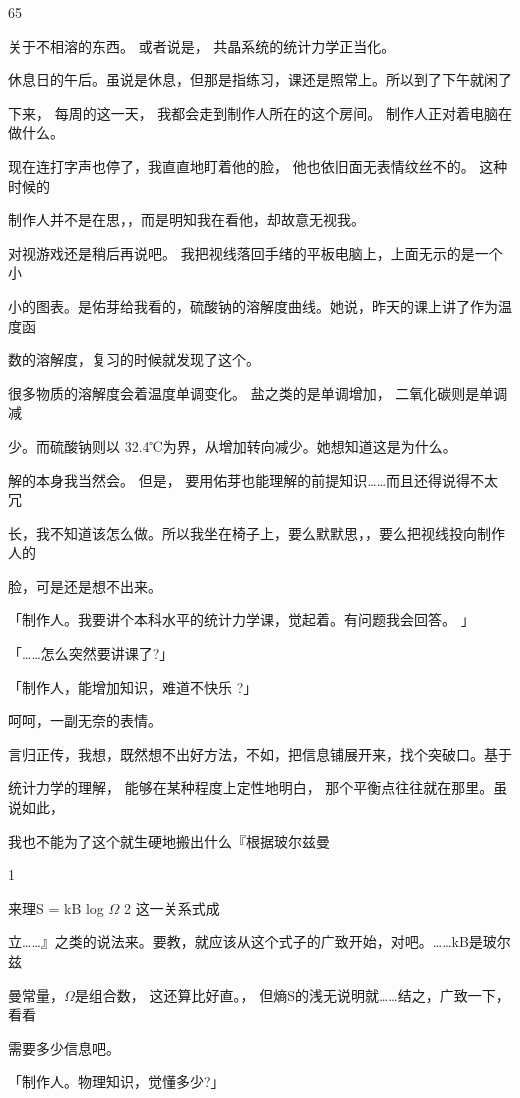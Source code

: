 65\par
关于不相溶的东西。 或者说是， 共晶系统的统计力学正当化。\par
休息日的午后。虽说是休息，但那是指练习，课还是照常上。所以到了下午就闲了\par
下来， 每周的这一天， 我都会走到制作人所在的这个房间。 制作人正对着电脑在做什么。\par
现在连打字声也停了，我直直地盯着他的脸， 他也依旧面无表情纹丝不的。 这种时候的\par
制作人并不是在思，，而是明知我在看他，却故意无视我。\par
对视游戏还是稍后再说吧。 我把视线落回手绪的平板电脑上，上面无示的是一个小\par
小的图表。是佑芽给我看的，硫酸钠的溶解度曲线。她说，昨天的课上讲了作为温度函\par
数的溶解度，复习的时候就发现了这个。\par
很多物质的溶解度会着温度单调变化。 盐之类的是单调增加， 二氧化碳则是单调减\par
少。而硫酸钠则以 32.4℃为界，从增加转向减少。她想知道这是为什么。\par
解的本身我当然会。 但是， 要用佑芽也能理解的前提知识……而且还得说得不太冗\par
长，我不知道该怎么做。所以我坐在椅子上，要么默默思，，要么把视线投向制作人的\par
脸，可是还是想不出来。\par
「制作人。我要讲个本科水平的统计力学课，觉起着。有问题我会回答。 」\par
「……怎么突然要讲课了?」\par
「制作人，能增加知识，难道不快乐 ?」\par
呵呵，一副无奈的表情。\par
言归正传，我想，既然想不出好方法，不如，把信息铺展开来，找个突破口。基于\par
统计力学的理解， 能够在某种程度上定性地明白， 那个平衡点往往就在那里。虽说如此，\par
我也不能为了这个就生硬地搬出什么『根据玻尔兹曼\par
1\par
来理S = kB log $\Omega$ 2 这一关系式成\par
立……』之类的说法来。要教，就应该从这个式子的广致开始，对吧。……kB是玻尔兹\par
曼常量，$\Omega$是组合数， 这还算比好直。， 但熵S的浅无说明就……结之，广致一下， 看看\par
需要多少信息吧。\par
「制作人。物理知识，觉懂多少?」\par
